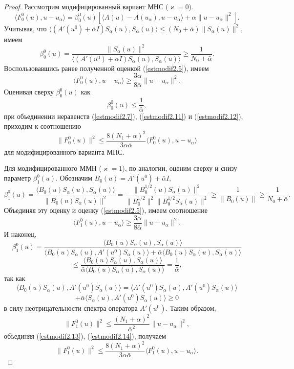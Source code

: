 \begin{proof}
Рассмотрим модифицированный вариант МНС ($\varkappa=0$).
$$\langle F_0^0(u), u-u_\alpha\rangle=\beta_0^0(u)[\langle A(u)-A(u_\alpha), u-u_\alpha\rangle+\alpha\|u-u_\alpha\|^2].$$
Учитывая, что $\langle (A'(u^0)+\bar{\alpha}I)S_\alpha(u), S_\alpha(u)\rangle\le(N_0+\bar{\alpha})\|S_\alpha(u)\|^2$, имеем
$$\beta_0^0(u)=\frac{\|S_\alpha(u)\|^2}{\langle (A'(u^0)+\bar{\alpha}I)S_\alpha(u), S_\alpha(u)\rangle}\ge\frac{1}{N_0+\bar{\alpha}}.$$
Воспользовавшись ранее полученной оценкой (\ref{estmodif2.5}), имеем
\begin{equation}\label{estmodif2.11}
\langle F_0^0(u), u-u_\alpha\rangle\ge\frac{3\alpha}{8\bar{\alpha}}\|u-u_\alpha\|^2.
\end{equation}
Оценивая сверху $\beta_0^0(u)$ как
\begin{equation}\label{estmodif2.12}
\beta_0^0(u)\le\frac{1}{\bar{\alpha}},
\end{equation}
при объединении неравенств (\ref{estmodif2.7}), (\ref{estmodif2.11}) и (\ref{estmodif2.12}), приходим к соотношению
$$\|F_0^0(u)\|^2\le\frac{8(N_1+\alpha)^2}{3\alpha\bar{\alpha}}\langle F_0^0(u), u-u_\alpha\rangle$$ для модифицированного варианта МНС.

Для модифицированного ММН ($\varkappa=1$), по аналогии, оценим сверху и снизу параметр $\beta_1^0(u)$. Обозначим $B_0(u)=A'(u^0)+\bar{\alpha}I,$
$$\beta_1^0(u)=\frac{\langle B_0(u)S_\alpha(u), S_\alpha(u)\rangle}{\|B_0(u)S_\alpha(u)\|^2}=\frac{\|B_0^{1/2}(u)S_\alpha(u)\|^2}{\|B_0^{1/2}\|^2\|B_0^{1/2}S_\alpha(u)\|^2}\ge\frac{1}{\|B_0(u)\|}\ge\frac{1}{N_0+\bar{\alpha}}.$$
Объединяя эту оценку и оценку (\ref{estmodif2.5}), имеем соотношение
\begin{equation}\label{estmodif2.13}
\langle F_1^0(u), u-u_\alpha\rangle\ge\frac{3\alpha}{8\bar{\alpha}}\|u-u_\alpha\|^2.
\end{equation}
И наконец,
$$\beta_1^0(u)=\frac{\langle B_0(u)S_\alpha(u), S_\alpha(u)\rangle}{\langle B_0(u)S_\alpha(u), A'(u^0)S_\alpha(u)\rangle+\bar{\alpha}\langle B_0(u)S_\alpha(u), S_\alpha(u)\rangle}$$
$$\le\frac{\langle B_0(u)S_\alpha(u), S_\alpha(u)\rangle}{\bar{\alpha}\langle B_0(u)S_\alpha(u), S_\alpha(u)\rangle}=\frac{1}{\bar{\alpha}},$$
так как $$\langle B_0(u)S_\alpha(u), A'(u^0)S_\alpha(u)\rangle=\langle A'(u^0)S_\alpha(u), A'(u^0)S_\alpha(u)\rangle$$$$+\bar{\alpha}\langle S_\alpha(u), A'(u^0)S_\alpha(u)\rangle\ge 0$$ в силу неотрицательности спектра оператора $A'(u^0)$. Таким образом,
\begin{equation}\label{estmodif2.14}
\|F_1^0(u)\|^2\le\frac{(N_1+\alpha)^2}{\bar{\alpha}^2}\|u-u_\alpha\|^2,
\end{equation}
объединяя (\ref{estmodif2.13}), (\ref{estmodif2.14}), получаем
$$\|F_1^0(u)\|^2\le\frac{8(N_1+\alpha)^2}{3\alpha\bar{\alpha}}\langle F_1^0(u), u-u_\alpha\rangle.$$
\end{proof}

